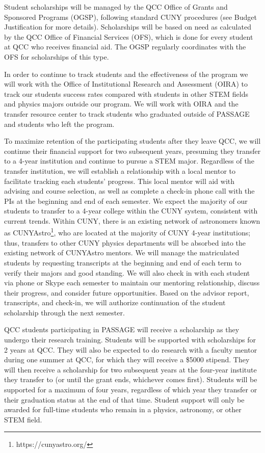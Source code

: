 \documentclass[12pt]{article}
\begin{document}
Student scholarships will be managed by the QCC Office of Grants and Sponsored Programs (OGSP), following standard CUNY procedures (see Budget Justification for more details).  Scholarships will be based on need as calculated by the QCC Office of Financial Services (OFS), which is done for every student at QCC who receives financial aid.  The OGSP regularly coordinates with the OFS for scholarships of this type.  

In order to continue to track students and the effectiveness of the program we will work with the Office of Institutional Research and Assessment (OIRA) to track our students success rates compared with students in other STEM fields and physics majors outside our program.  We will work with OIRA and the transfer resource center to track students who graduated outside of PASSAGE and students who left the program.  

To maximize retention of the participating students after they leave QCC, we will continue their financial support for two subsequent years, presuming they transfer to a 4-year institution and continue to pursue a STEM  major.  Regardless of the transfer institution, we will establish a relationship with a local mentor to facilitate tracking each students' progress.  This local mentor will aid with advising and course selection, as well as complete a check-in phone call with the PIs at the beginning and end of each semester.  We expect the majority of our students to transfer to a 4-year college within the CUNY system, consistent with current trends.  Within CUNY, there is an existing network of astronomers known as CUNYAstro\footnote{https://cunyastro.org/}, who are located at the majority of CUNY 4-year institutions; thus, transfers to other CUNY physics departments will be absorbed into the existing network of CUNYAstro  mentors.  We will manage the matriculated students by requesting transcripts at the beginning and end of each term to verify their majors and good standing.  We will also check in with each student via phone or Skype each semester to maintain our mentoring relationship, discuss their progress, and consider future opportunities.  Based on the advisor report, transcripts, and check-in, we will authorize continuation of the student scholarship through the next semester.  

QCC students participating in PASSAGE will receive a scholarship as they undergo their research training. Students will be supported with scholarships for 2 years at QCC.  They will also be expected to do research with a faculty mentor during one summer at QCC, for which they will receive a \$5000 stipend.  They will then receive a scholarship for two subsequent years at the four-year institute they transfer to (or until the grant ends, whichever comes first).  Students will be supported for a maximum of four years, regardless of which year they transfer or their graduation status at the end of that time. Student support will only be awarded for full-time students who remain in a physics, astronomy, or other STEM field.  
\end{document}
